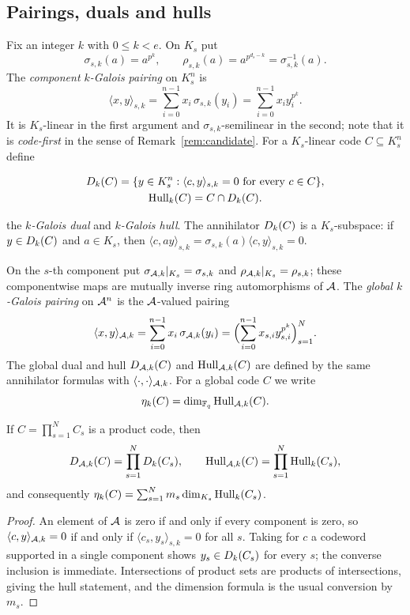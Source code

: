 \subsection{Pairings, duals and hulls}\label{sec:pairing}

Fix an integer $k$ with $0\leq k<e$.  On $K_s$ put
\[
\sigma_{s,k}(a)=a^{p^k},\qquad
\rho_{s,k}(a)=a^{p^{d_s-k}}=\sigma_{s,k}^{-1}(a).
\]
The \emph{component $k$-Galois pairing} on $K_s^n$ is
\begin{equation}\label{eq:pairing}
\langle x,y\rangle_{s,k}
   =\sum_{i=0}^{n-1}x_i\,\sigma_{s,k}(y_i)
   =\sum_{i=0}^{n-1}x_i y_i^{p^k}.
\end{equation}
It is $K_s$-linear in the first argument and $\sigma_{s,k}$-semilinear in the
second; note that it is \emph{code-first} in the sense of
Remark~\ref{rem:candidate}.  For a $K_s$-linear code $C\subseteq K_s^n$ define

\[
\begin{gathered}
D_k(C)=\{y\in K_s^n:\langle c,y\rangle_{s,k}=0
\text{ for every }c\in C\},\\
\operatorname{Hull}_k(C)=C\cap D_k(C).
\end{gathered}
\]

the \emph{$k$-Galois dual} and \emph{$k$-Galois hull}.  The annihilator
$D_k(C)$ is a $K_s$-subspace: if $y\in D_k(C)$ and $a\in K_s$, then
$\langle c,ay\rangle_{s,k}=\sigma_{s,k}(a)\langle c,y\rangle_{s,k}=0$.

On the $s$-th component put $\sigma_{\mathcal A,k}|_{K_s}=\sigma_{s,k}$ and
$\rho_{\mathcal A,k}|_{K_s}=\rho_{s,k}$; these componentwise maps are mutually inverse
ring automorphisms of $\mathcal A$.  The \emph{global $k$-Galois pairing} on
$\mathcal A^n$ is the $\mathcal A$-valued pairing
\[
\langle x,y\rangle_{\mathcal A,k}
   =\sum_{i=0}^{n-1}x_i\,\sigma_{\mathcal A,k}(y_i)
   =\Bigl(\sum_{i=0}^{n-1}x_{s,i}y_{s,i}^{p^k}\Bigr)_{s=1}^{N}.
\]
The global dual and hull $D_{\mathcal A,k}(C)$ and $\operatorname{Hull}_{\mathcal A,k}(C)$ are defined by the
same annihilator formulas with $\langle\cdot,\cdot\rangle_{\mathcal A,k}$.  For a
global code $C$ we write
\[
\eta_k(C)=\dim_{\mathbb F_q}\operatorname{Hull}_{\mathcal A,k}(C).
\]

\begin{lemma}\label{lem:global-duality}
If $C=\prod_{s=1}^{N}C_s$ is a product code, then
\[
D_{\mathcal A,k}(C)=\prod_{s=1}^{N}D_k(C_s),
\qquad
\operatorname{Hull}_{\mathcal A,k}(C)=\prod_{s=1}^{N}\operatorname{Hull}_k(C_s),
\]
and consequently
$\eta_k(C)=\sum_{s=1}^{N}m_s\dim_{K_s}\operatorname{Hull}_k(C_s)$.
\end{lemma}

\begin{proof}
An element of $\mathcal A$ is zero if and only if every component is zero, so
$\langle c,y\rangle_{\mathcal A,k}=0$ if and only if
$\langle c_s,y_s\rangle_{s,k}=0$ for all $s$.  Taking for $c$ a codeword
supported in a single component shows $y_s\in D_k(C_s)$ for every $s$; the
converse inclusion is immediate.  Intersections of product sets are products of
intersections, giving the hull statement, and the dimension formula is the
usual conversion by $m_s$.
\end{proof}

